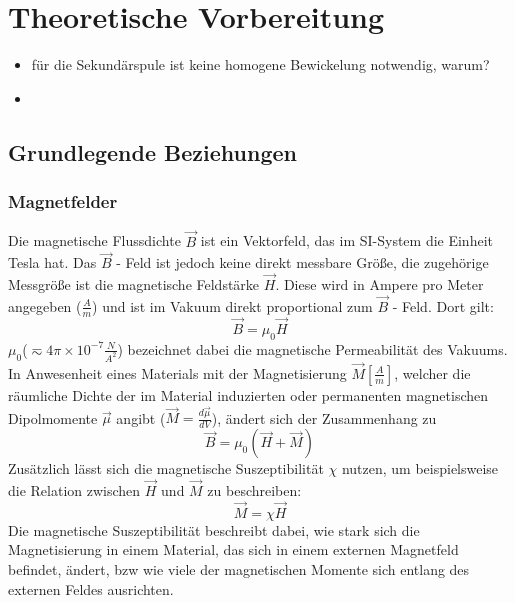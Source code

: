 \section{Theoretische Vorbereitung}
    \begin{itemize}
        \item für die Sekundärspule ist keine homogene Bewickelung notwendig, warum?
        \item 
    \end{itemize}
    \subsection{Grundlegende Beziehungen}
        \subsubsection{Magnetfelder}
            Die magnetische Flussdichte $\vec{B}$ ist ein Vektorfeld, das im SI-System die Einheit Tesla hat.
            Das $\vec{B}$ - Feld ist jedoch keine direkt messbare Größe, die zugehörige Messgröße ist die magnetische Feldstärke $\vec{H}$.
            Diese wird in Ampere pro Meter angegeben ($\frac{A}{m}$) und ist im Vakuum direkt proportional
            zum $\vec{B}$ - Feld. Dort gilt:
            \begin{equation}
                \vec{B} = \mu_0 \vec{H}
            \end{equation}
            $\mu_0$($\eqsim 4\pi ×10^{-7 }\frac{N}{A^2}$) bezeichnet dabei die magnetische Permeabilität des Vakuums.
            In Anwesenheit eines Materials mit der Magnetisierung $\vec{M} [\frac{A}{m}]$, welcher die räumliche Dichte der im Material induzierten oder permanenten magnetischen Dipolmomente $\vec{\mu}$ angibt ($\vec{M} = \frac{d\vec{\mu}}{dV}$), ändert sich der Zusammenhang zu
            \begin{equation}
                \vec{B} = \mu_0 (\vec{H} + \vec{M})
            \end{equation}
            Zusätzlich lässt sich die magnetische Suszeptibilität $\chi$ nutzen, um beispielsweise die Relation zwischen $\vec{H}$ und $\vec{M}$ zu beschreiben:
            \begin{equation}
                \vec{M} = \chi \vec{H}
            \end{equation}
            Die magnetische Suszeptibilität beschreibt dabei, wie stark sich die Magnetisierung in einem
            Material, das sich in einem externen Magnetfeld befindet, ändert, bzw wie viele der magnetischen Momente sich entlang des externen Feldes ausrichten.
